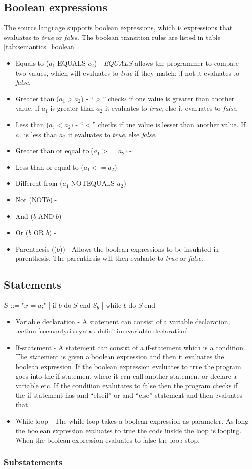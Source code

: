 \subsection{Boolean expressions}
The source language supports boolean expressions, which is expressions that evaluates to \textit{true} or \textit{false}. The boolean transition rules are listed in table \ref{tab:semantics_boolean}.
\begin{itemize}
	\item Equals to ($a_1$ EQUALS $a_2$) - $EQUALS$ allows the programmer to compare two values, which will evaluates to \textit{true} if they match; if not it evaluates to \textit{false}.
	\item Greater than ($a_1 > a_2$) - ``$>$'' checks if one value is greater than another value. If $a_1$ is greater than $a_2$ it evaluates to \textit{true}, else it evaluates to \textit{false}.
	\item Less than ($a_1 < a_2$) - ``$<$'' checks if one value is lesser than another value. If $a_1$ is less than $a_2$ it evaluates to \textit{true}, else \textit{false}.
	\item Greater than or equal to ($a_1 >= a_2$) - 
	\item Less than or equal to ($a_1 <= a_2$) - 
	\item Different from ($a_1$ NOTEQUALS $a_2$) - 
	\item Not (NOT$b$) -
	\item And ($b$ AND $b$) -
	\item Or ($b$ OR $b$) -
	\item Parenthesis (($b$)) - Allows the boolean expressions to be insulated in parenthesis. The parenthesis will then evaluate to \textit{true} or \textit{false}.
\end{itemize}
\subsection{Statements}

$S$ ::= "$x$ = $a$;" | if $b$ do $S$ end $S_b$ | while $b$ do $S$ end

\begin{itemize}
	\item Variable declaration - A statement can consist of a variable declaration, section \ref{sec:analysis:syntax-definition:variable-declaration}.
	\item If-statement - A statement can consist of a if-statement which is a condition. The statement is given a boolean expression and then it evaluates the boolean expression. If the boolean expression evaluates to true the program goes into the if-statement where it can call another statement or declare a variable etc. If the condition evalutates to false then the program checks if the if-statement has and ``elseif'' or and ``else'' statement and then evaluates that.
	\item While loop - The while loop takes a boolean expression as parameter. As long the boolean expression evaluates to true the code inside the loop is looping. When the boolean expression evaluates to false the loop stop.
\end{itemize}

\subsubsection{Substatements}


